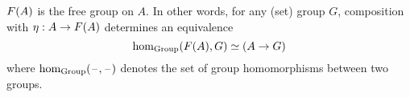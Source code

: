 \documentclass[hott-all.tex]{subfiles}
\begin{document}
% 
% 
% 
\begin{thm}
  $F(A)$ is the free group on $A$.
  In other words, for any (set) group $G$, composition with $\eta:A\to F(A)$ determines an equivalence
  \[ \hom_{\mathrm{Group}}(F(A),G) \simeq (A\to G) \]
  where $\hom_{\mathrm{Group}}(\mathord{\hspace{1pt}\text{--}\hspace{1pt}},\mathord{\hspace{1pt}\text{--}\hspace{1pt}})$ denotes the set of group homomorphisms between two groups.
\end{thm}
\end{document}

